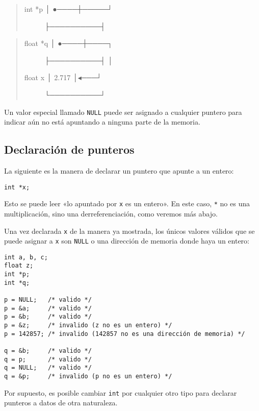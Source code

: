 \begin{quote}
\begin{description}
\item[int *p │ ●────┼─────┘]
├──────────┤
\end{description}
\end{quote}

\begin{quote}
\begin{description}
\item[float *q │ ●────┼────┐]
├──────────┤ │
\item[float x │ 2.717 │◂───┘]
└──────────┘
\end{description}
\end{quote}

Un valor especial llamado \lstinline!NULL! puede ser asignado a
cualquier puntero para indicar aún no está apuntando a ninguna parte de
la memoria.

\subsection{Declaración de punteros}

La siguiente es la manera de declarar un puntero que apunte a un entero:

\begin{lstlisting}
int *x;
\end{lstlisting}

Esto se puede leer «lo apuntado por \lstinline!x! es un entero». En este
caso, \lstinline!*! no es una multiplicación, sino una
derreferenciación, como veremos más abajo.

Una vez declarada \lstinline!x! de la manera ya mostrada, los únicos
valores válidos que se puede asignar a \lstinline!x! son
\lstinline!NULL! o una dirección de memoria donde haya un entero:

\begin{lstlisting}
int a, b, c;
float z;
int *p;
int *q;

p = NULL;   /* valido */
p = &a;     /* valido */
p = &b;     /* valido */
p = &z;     /* invalido (z no es un entero) */
p = 142857; /* invalido (142857 no es una dirección de memoria) */

q = &b;     /* valido */
q = p;      /* valido */
q = NULL;   /* valido */
q = &p;     /* invalido (p no es un entero) */
\end{lstlisting}

Por supuesto, es posible cambiar \lstinline!int! por cualquier otro tipo
para declarar punteros a datos de otra naturaleza.

